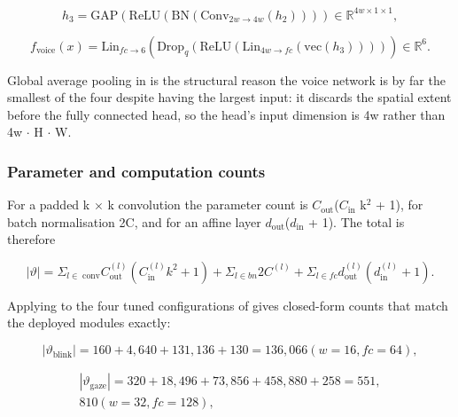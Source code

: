 \begin{equation}
\label{eq:78}
h_{3} = \mathrm{GAP}( \mathrm{ReLU}( \mathrm{BN}( \mathrm{Conv}_{2w \to 4w}(h_{2}) ) ) ) \in \mathbb{R}^{4w\times 1\times 1},
\end{equation}

\begin{equation}
\label{eq:79}
f_{\mathrm{voice}}(x) = \mathrm{Lin}_{fc \to 6}( \mathrm{Drop}_q( \mathrm{ReLU}( \mathrm{Lin}_{4w \to fc}( \mathrm{vec}(h_{3}) ) ) ) ) \in \mathbb{R}^{6}.
\end{equation}

Global average pooling in  is the structural reason the voice network is by far the smallest of the four despite having the largest input: it discards the spatial extent before the fully connected head, so the head's input dimension is 4w rather than 4w $\cdot$ H $\cdot$ W.

\subsubsection{Parameter and computation counts}

For a padded k $\times$ k convolution the parameter count is $C_{\mathrm{out}}$($C_{\mathrm{in}}$ k$^{2}$ + 1), for batch normalisation 2C, and for an affine layer $d_{\mathrm{out}}$($d_{\mathrm{in}}$ + 1). The total is therefore

\begin{equation}
\label{eq:80}
|\vartheta | = \Sigma _{l \in \;\text{conv}} C_{\mathrm{out}}^{(l)} ( C_{\mathrm{in}}^{(l)} k^{2} + 1 ) + \Sigma _{l \in bn} 2 C^{(l)} + \Sigma _{l \in fc} d_{\mathrm{out}}^{(l)} ( d_{\mathrm{in}}^{(l)} + 1 ).
\end{equation}

Applying  to the four tuned configurations of  gives closed-form counts that match the deployed modules exactly:

\begin{equation}
\label{eq:81}
|\vartheta _{\mathrm{blink}}| = 160 + 4,640 + 131,136 + 130 = 136,066 (w = 16, fc = 64),
\end{equation}

\begin{equation}
\label{eq:82}
\begin{aligned}
|\vartheta _{\mathrm{gaze}}| = 320 + 18, 496 + 73, 856 + 458, 880 + 258 = 551, \\
810 (w = 32, fc = 128),
\end{aligned}
\end{equation}

